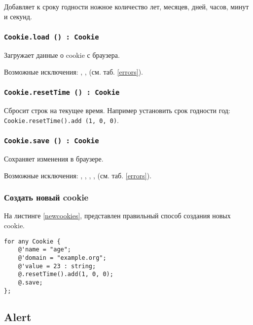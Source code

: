 Добавляет к сроку годности ножное количество лет, месяцев, дней, часов, минут и секунд.

\subsubsection{\texttt{Cookie.load () : Cookie}}

Загружает данные о cookie с браузера.

Возможные исключения: , ,  (см. таб. \ref{errors}).

\subsubsection{\texttt{Cookie.resetTime () : Cookie}}

Сбросит строк на текущее время. Например установить срок годности год: \texttt{Cookie.resetTime().add (1, 0, 0)}.

\subsubsection{\texttt{Cookie.save () : Cookie}}

Сохраняет изменения в браузере.

Возможные исключения: , , , ,  (см. таб. \ref{errors}).

\subsubsection{Создать новый cookie}

На листинге \ref{newcookies}, представлен правильный способ создания новых cookie.

\begin{sourcecode}
\label{newcookies}
\begin{verbatim}
for any Cookie {
	@'name = "age";
	@'domain = "example.org";
	@'value = 23 : string;
	@.resetTime().add(1, 0, 0);
	@.save;
};
\end{verbatim}
\end{sourcecode}


\subsection{{\color{orange} Alert}}

